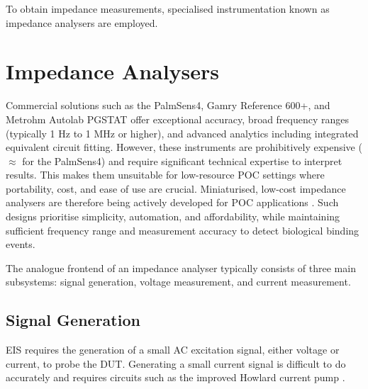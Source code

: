To obtain impedance measurements, specialised instrumentation known as impedance analysers are employed.

\section{Impedance Analysers}

Commercial solutions such as the PalmSens4, Gamry Reference 600+, and Metrohm Autolab PGSTAT offer exceptional accuracy, broad frequency ranges (typically 1 Hz to 1 MHz or higher), and advanced analytics including integrated equivalent circuit fitting. However, these instruments are prohibitively expensive ($\approx$  for the PalmSens4) and require significant technical expertise to interpret results. This makes them unsuitable for low-resource \ac{POC} settings where portability, cost, and ease of use are crucial. Miniaturised, low-cost impedance analysers are therefore being actively developed for POC applications \cite{buscagliaSimpleZLowCostPortable2023, al-aliDesignPortableLowCost2017, ibrahimCMOSTransimpedanceAmplifier}. Such designs prioritise simplicity, automation, and affordability, while maintaining sufficient frequency range and measurement accuracy to detect biological binding events.

The analogue frontend of an impedance analyser typically consists of three main subsystems: signal generation, voltage measurement, and current measurement.
\subsection{Signal Generation}\label{subsec:lit_review_excitation}
\Ac{EIS} requires the generation of a small AC excitation signal, either voltage or current, to probe the \ac{DUT}. Generating a small current signal is difficult to do accurately and requires circuits such as the improved Howlard current pump \cite{ImprovedHowlandCurrent2020}. 

